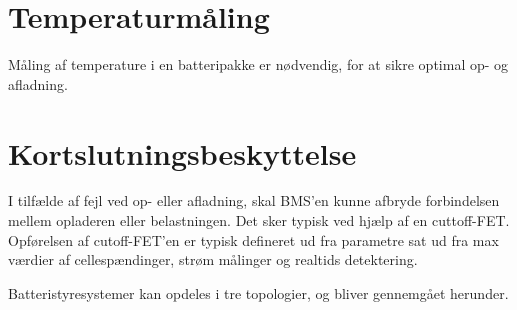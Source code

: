\section{Temperaturmåling}
Måling af temperature i en batteripakke er nødvendig, for at sikre optimal op- og afladning. 

\section{Kortslutningsbeskyttelse}
I tilfælde af fejl ved op- eller afladning, skal BMS'en kunne afbryde forbindelsen mellem opladeren eller belastningen. Det sker typisk ved hjælp af en cuttoff-FET. Opførelsen af cutoff-FET'en er typisk defineret ud fra parametre sat ud fra max værdier af cellespændinger, strøm målinger og realtids detektering. 

Batteristyresystemer kan opdeles i tre topologier, og bliver gennemgået herunder.